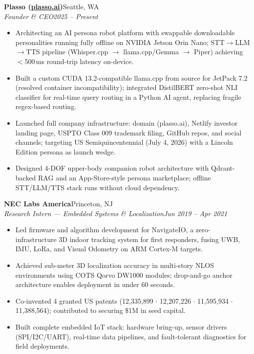 \documentclass[10.5pt,letterpaper]{article}
\newcommand{\entrytitle}[2]{%
  \textbf{#1}\hfill #2%
}
\newcommand{\entrysub}[2]{%
  \textit{#1}\hfill \textit{#2}%
}
\begin{document}
\entrytitle{Plasso (\href{https://plasso.ai}{plasso.ai})}{Seattle, WA}\\
\entrysub{Founder \& CEO}{2025 -- Present}
\begin{itemize}
  \item Architecting an AI persona robot platform with swappable downloadable personalities running fully
        offline on NVIDIA Jetson Orin Nano; STT$\to$LLM$\to$TTS pipeline (Whisper.cpp $\to$ llama.cpp/Gemma
        $\to$ Piper) achieving $<$500\,ms round-trip latency on-device.
  \item Built a custom CUDA 13.2-compatible llama.cpp from source for JetPack 7.2 (resolved container
        incompatibility); integrated DistilBERT zero-shot NLI classifier for real-time query routing in a
        Python AI agent, replacing fragile regex-based routing.
  \item Launched full company infrastructure: domain (plasso.ai), Netlify investor landing page, USPTO
        Class 009 trademark filing, GitHub repos, and social channels; targeting US Semiquincentennial
        (July 4, 2026) with a Lincoln Edition persona as launch wedge.
  \item Designed 4-DOF upper-body companion robot architecture with Qdrant-backed RAG and an
        App-Store-style persona marketplace; offline STT/LLM/TTS stack runs without cloud dependency.
\end{itemize}

\vspace{4pt}
\entrytitle{NEC Labs America}{Princeton, NJ}\\
\entrysub{Research Intern --- Embedded Systems \& Localization}{Jun 2019 -- Apr 2021}
\begin{itemize}
  \item Led firmware and algorithm development for NavigateIO, a zero-infrastructure 3D indoor tracking
        system for first responders, fusing UWB, IMU, LoRa, and Visual Odometry on ARM Cortex-M targets.
  \item Achieved sub-meter 3D localization accuracy in multi-story NLOS environments using COTS Qorvo
        DW1000 modules; drop-and-go anchor architecture enables deployment in under 60 seconds.
  \item Co-invented 4 granted US patents (12,335,899 $\cdot$ 12,207,226 $\cdot$ 11,595,934 $\cdot$
        11,388,564); contributed to securing \$1M in seed capital.
  \item Built complete embedded IoT stack: hardware bring-up, sensor drivers (SPI/I2C/UART), real-time
        data pipelines, and fault-tolerant diagnostics for field deployments.
\end{itemize}
\end{document}
